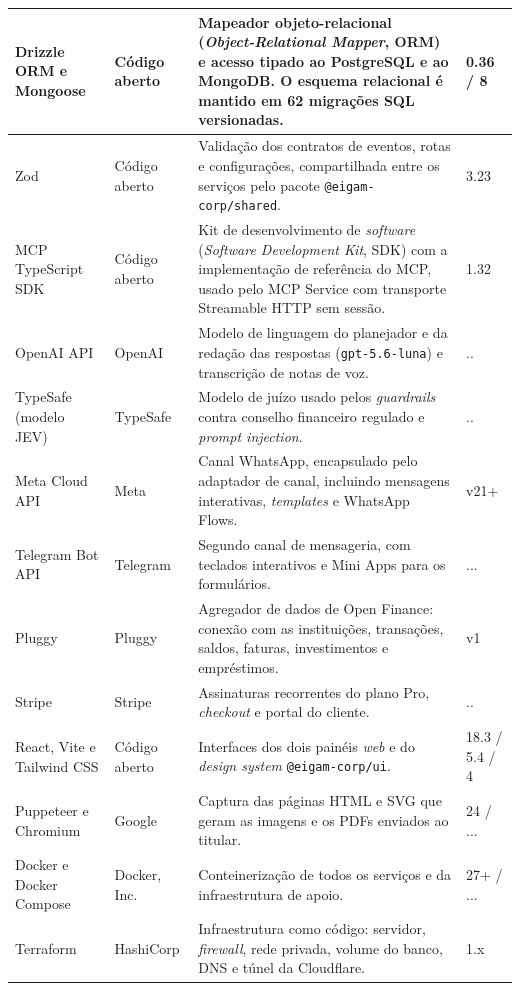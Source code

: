 {\begin{longtable}{|L{3.2cm}|L{2.8cm}|L{6.7cm}|L{1.5cm}|}
Drizzle ORM e Mongoose & Código aberto & Mapeador objeto-relacional (\textit{Object-Relational Mapper}, ORM) e acesso tipado ao PostgreSQL e ao MongoDB. O esquema relacional é mantido em 62 migrações SQL versionadas. & 0.36 / 8 \\ \hline
Zod & Código aberto & Validação dos contratos de eventos, rotas e configurações, compartilhada entre os serviços pelo pacote \texttt{@eigam-corp/shared}. & 3.23 \\ \hline
MCP TypeScript SDK & Código aberto & Kit de desenvolvimento de \textit{software} (\textit{Software Development Kit}, SDK) com a implementação de referência do MCP, usado pelo MCP Service com transporte Streamable HTTP sem sessão. & 1.32 \\ \hline
OpenAI API & OpenAI & Modelo de linguagem do planejador e da redação das respostas (\texttt{gpt-5.6-luna}) e transcrição de notas de voz. & .. \\ \hline
TypeSafe (modelo JEV) & TypeSafe & Modelo de juízo usado pelos \textit{guardrails} contra conselho financeiro regulado e \textit{prompt injection}. & .. \\ \hline
Meta Cloud API & Meta & Canal WhatsApp, encapsulado pelo adaptador de canal, incluindo mensagens interativas, \textit{templates} e WhatsApp Flows. & v21+ \\ \hline
Telegram Bot API & Telegram & Segundo canal de mensageria, com teclados interativos e Mini Apps para os formulários. & ... \\ \hline
Pluggy & Pluggy & Agregador de dados de Open Finance: conexão com as instituições, transações, saldos, faturas, investimentos e empréstimos. & v1 \\ \hline
Stripe & Stripe & Assinaturas recorrentes do plano Pro, \textit{checkout} e portal do cliente. & .. \\ \hline
React, Vite e Tailwind CSS & Código aberto & Interfaces dos dois painéis \textit{web} e do \textit{design system} \texttt{@eigam-corp/ui}. & 18.3 / 5.4 / 4 \\ \hline
Puppeteer e Chromium & Google & Captura das páginas HTML e SVG que geram as imagens e os PDFs enviados ao titular. & 24 / ... \\ \hline
Docker e Docker Compose & Docker, Inc. & Conteinerização de todos os serviços e da infraestrutura de apoio. & 27+ / ... \\ \hline
Terraform & HashiCorp & Infraestrutura como código: servidor, \textit{firewall}, rede privada, volume do banco, DNS e túnel da Cloudflare. & 1.x \\ \hline

\end{longtable}}
